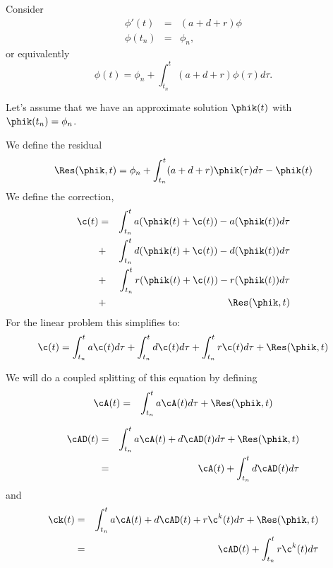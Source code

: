 
Consider 
\begin{eqnarray}
  \label{eq:phiode}
  \phi'(t)& = & (a+d+r)\phi\\
  \phi(t_n)& = & \phi_n,
\end{eqnarray}
or equivalently
\begin{equation}
  \label{eq:phipicard}
  \phi(t) =  \phi_n+ \int_{t_n}^t (a+d+r)\phi(\tau) d\tau.
\end{equation}

Let's assume that we have an approximate solution $\phik(t)$
with $\phik(t_n) = \phi_n$.

We define the residual
\begin{equation}
  \label{eq:resid}
  \Res(\phik,t) = \phi_n + \int_{t_n}^t (a+d+r)\phik(\tau) d\tau -\phik(t) 
\end{equation}
We define the correction,
\begin{eqnarray}
  \c(t)& = & \int_{t_n}^t a(\phik(t)+\c(t))- a(\phik(t)) d\tau \\
        & + &   \int_{t_n}^t d( \phik(t)+\c(t)) - d(\phik(t))d\tau  \\
        & +  & \int_{t_n}^t r(\phik(t)+\c(t)) - r(\phik(t))d\tau \\
       &  +  &  \Res(\phik,t) 
\end{eqnarray}
For the linear problem this simplifies to:
\begin{equation}
  \c(t) =  \int_{t_n}^t a\c(t) d\tau + \int_{t_n}^t d \c(t) d\tau   +  \int_{t_n}^t r\c(t) d\tau   +  \Res(\phik,t) \end{equation}

We will do a coupled splitting of this equation by defining
\begin{eqnarray}
  \cA(t) & = & \int_{t_n}^t a\cA(t) d\tau + \Res(\phik,t)
\end{eqnarray}

\begin{eqnarray}
  \cAD(t) & = &  \int_{t_n}^t a\cA(t) + d\cAD(t) d\tau + \Res(\phik,t) \\
          & = &  \cA(t) +  \int_{t_n}^t d\cAD(t) d\tau 
\end{eqnarray}
and
\begin{eqnarray}
  \ck(t)& = & \int_{t_n}^t a\cA(t) + d\cAD(t) +  r\c^k(t) d\tau   +   \Res(\phik,t)  \\
         & = &  \cAD(t) +  \int_{t_n}^t r\c^k(t) d\tau \\
\end{eqnarray}

